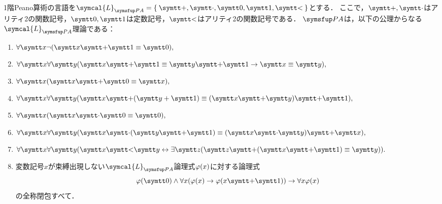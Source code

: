 \begin{Def} \label{Def:peanoarithmetic}
	1階Peano算術の言語を\(\symcal{L}_{\PA} = \Set{\obj{+}, \obj{\cdot}, \obj{0}, \obj{1}, \obj{<}}\)とする．
	ここで，\(\obj{+}, \obj{\cdot}\)はアリティ2の関数記号，\(\obj{0}, \obj{1}\)は定数記号，\(\obj{<}\)はアリティ2の関数記号である．
	\(\PA\)は，以下の公理からなる\(\symcal{L}_{\PA}\)理論である：
	\begin{enumerate}[label=A\arabic*.,ref=A\arabic*]
		\item \label{item:PAA1} \(\forall \obj{x} \lnot \paren{\obj{x} \obj{+} \obj{1} \objeq \obj{0}},\)
		\item \label{item:PAA2} \(\forall \obj{x} \forall \obj{y} \paren{\obj{x} \obj{+} \obj{1} \objeq \obj{y} \obj{+} \obj{1} \to \obj{x} \objeq \obj{y}},\)
		\item \label{item:PAA3} \(\forall \obj{x} \paren{\obj{x} \obj{+} \obj{0} \objeq \obj{x}},\)
		\item \label{item:PAA4} \(\forall \obj{x} \forall \obj{y} \paren{\obj{x} \obj{+} \paren{\obj{y} + \obj{1}} \objeq \paren{\obj{x} \obj{+} \obj{y}} \obj{+} \obj{1}},\)
		\item \label{item:PAA5} \(\forall \obj{x} \paren{\obj{x} \obj{\cdot} \obj{0} \objeq \obj{0}},\)
		\item \label{item:PAA6} \(\forall \obj{x} \forall \obj{y} \paren{\obj{x} \obj{\cdot} \paren{\obj{y} \obj{+} \obj{1}} \objeq \paren{\obj{x} \obj{\cdot} \obj{y}} \obj{+} \obj{x}},\)
		\item \label{item:PAA7} \(\forall \obj{x} \forall \obj{y} \paren{\obj{x} \obj{<} \obj{y} \formulaequiv \exists \obj{z} \paren{\obj{z} \obj{+} \paren{\obj{x} \obj{+} \obj{1}}\objeq \obj{y}}}.\)
		\item \label{item:PAA8} 変数記号\(x\)が束縛出現しない\(\symcal{L}_{\PA}\)論理式\(\apply{\varphi}{x}\)に対する論理式
		      \begin{equation}
			      \apply{\varphi}{\obj{0}} \land \forall x \paren{\apply{\varphi}{x} \to \apply{\varphi}{x \obj{+} \obj{1}}} \to \forall x \apply{\varphi}{x}
			      \label{eq:inductionscheme}
		      \end{equation}
		      の全称閉包すべて．
	\end{enumerate}
\end{Def}

